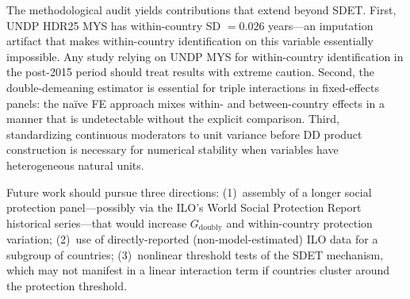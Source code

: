 \documentclass[11pt,letterpaper]{article}
\begin{document}
The methodological audit yields contributions that extend beyond SDET. First, UNDP HDR25 MYS has
within-country SD $= 0.026$ years---an imputation artifact that makes within-country identification
on this variable essentially impossible. Any study relying on UNDP MYS for within-country
identification in the post-2015 period should treat results with extreme caution. Second, the
double-demeaning estimator is essential for triple interactions in fixed-effects panels: the na\"{i}ve
FE approach mixes within- and between-country effects in a manner that is undetectable without the
explicit comparison. Third, standardizing continuous moderators to unit variance before DD product
construction is necessary for numerical stability when variables have heterogeneous natural units.

Future work should pursue three directions: (1)~assembly of a longer social protection
panel---possibly via the ILO's World Social Protection Report historical series---that would
increase $G_\text{doubly}$ and within-country protection variation; (2)~use of directly-reported
(non-model-estimated) ILO data for a subgroup of countries; (3)~nonlinear threshold tests of the
SDET mechanism, which may not manifest in a linear interaction term if countries cluster around the
protection threshold.



\end{document}

